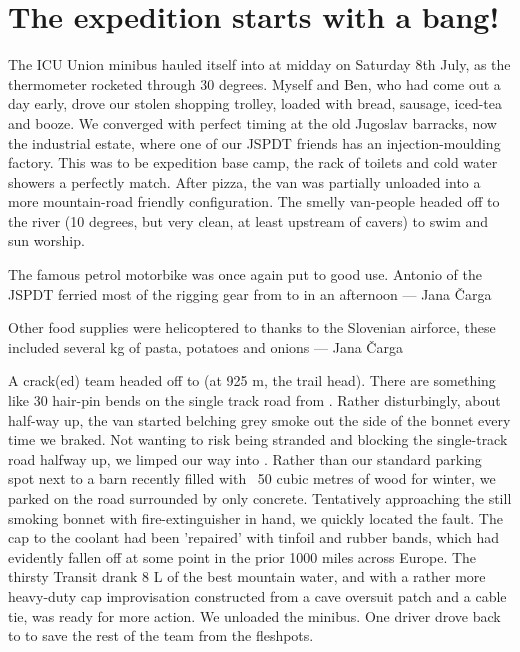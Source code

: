 \section{The expedition starts with a bang!}
The ICU Union minibus hauled itself into  at midday on Saturday 8th July, as the thermometer rocketed through 30 degrees. Myself and Ben, who had come out a day early, drove our stolen shopping trolley, loaded with bread, sausage, iced-tea and booze. We converged with perfect timing at the old Jugoslav barracks, now the industrial estate, where one of our JSPDT friends has an injection-moulding factory. This was to be expedition base camp, the rack of toilets and cold water showers a perfectly match. After pizza, the van was partially unloaded into a more mountain-road friendly configuration. The smelly van-people headed off to the  river (10 degrees, but very clean, at least upstream of cavers) to swim and sun worship. 

\begin{marginfigure}
\checkoddpage \ifoddpage \forcerectofloat \else \forceversofloat \fi
\centering
{}
\caption{The famous petrol motorbike was once again put to good use. Antonio of the JSPDT ferried most of the rigging gear from \protect{} to \protect{} in an afternoon --- Jana \v{C}arga}
\label{motorbike}
\end{marginfigure}

\begin{marginfigure}
\checkoddpage \ifoddpage \forcerectofloat \else \forceversofloat \fi
\centering
{}
\caption{Other food supplies were helicoptered to \protect{} thanks to the Slovenian airforce, these included several kg of pasta, potatoes and onions --- Jana \v{C}arga}
\label{helicopter fratnik}
\end{marginfigure}

A crack(ed) team headed off to  (at 925 m, the trail head). There are something like 30 hair-pin bends on the single track road from . Rather disturbingly, about half-way up, the van started belching  grey smoke out the side of the bonnet every time we braked. Not wanting to risk being stranded and blocking the single-track road halfway up, we limped our way into . Rather than our standard parking spot next to a barn recently filled with ~50 cubic metres of wood for winter, we parked on the road surrounded by only concrete. Tentatively approaching the still smoking bonnet with fire-extinguisher in hand, we quickly located the fault. The cap to the coolant had been 'repaired' with tinfoil and rubber bands, which had evidently fallen off at some point in the prior 1000 miles across Europe. The thirsty Transit drank 8 L of the best mountain water, and with a rather more heavy-duty cap improvisation constructed from a cave oversuit patch and a cable tie, was ready for more action. We unloaded the minibus. One driver drove back to  to save the rest of the team from the fleshpots. 

